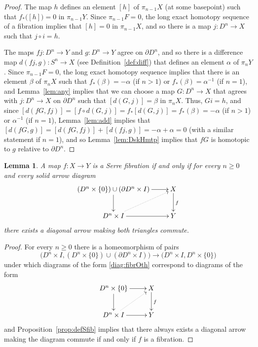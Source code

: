 \documentclass{amsart}
\numberwithin{equation}{section}
\theoremstyle{slplain}
\newtheorem{lem}[equation]{Lemma}
\theoremstyle{definition}
\theoremstyle{remark}
\newcommand{\propref}{Proposition~\ref}
\newcommand{\lemref}{Lemma~\ref}
\newcommand{\defref}{Definition~\ref}
\newcommand{\bdry}{\partial}
\begin{document}
\begin{proof}
  The map $h$ defines an element $[h]$ of $\pi_{n-1}X$ (at some
  basepoint) such that $f_{*}\bigl([h]\bigr) = 0$ in $\pi_{n-1}Y$.
  Since $\pi_{n-1}F = 0$, the long exact homotopy sequence of a
  fibration implies that $[h] = 0$ in $\pi_{n-1}X$, and so there is a
  map $j\colon D^{n} \to X$ such that $j\circ i = h$.

  The maps $fj\colon D^{n} \to Y$ and $g\colon D^{n} \to Y$ agree on
  $\partial D^{n}$, and so there is a difference map $d(fj,g)\colon
  S^{n} \to X$ (see \defref{def:diff}) that defines an element
  $\alpha$ of $\pi_{n}Y$.  Since $\pi_{n-1}F = 0$, the long exact
  homotopy sequence implies that there is an element $\beta$ of
  $\pi_{n}X$ such that $f_{*}(\beta) = -\alpha$ (if $n>1$) or
  $f_{*}(\beta) = \alpha^{-1}$ (if $n=1$), and \lemref{lem:any}
  implies that we can choose a map $G\colon D^{n} \to X$ that agrees
  with $j\colon D^{n} \to X$ on $\partial D^{n}$ such that $[d(G,j)] =
  \beta$ in $\pi_{n}X$.  Thus, $Gi = h$, and since $[d(fG, fj)] =
  [f\circ d(G,j)] = f_{*}[d(G,j)] = f_{*}(\beta) = -\alpha$ (if $n>1$)
  or $\alpha^{-1}$ (if $n=1$), \lemref{lem:add} implies that
  $[d(fG,g)] = [d(fG,fj)] + [d(fj,g)] = -\alpha + \alpha = 0$ (with a
  similar statement if $n=1$), and so \lemref{lem:DskHmtp} implies
  that $fG$ is homotopic to $g$ relative to $\bdry D^{n}$.
\end{proof}


\begin{lem}
  \label{lem:fibr}
  A map $f\colon X \to Y$ is a Serre fibration if and only if for
  every $n \ge 0$ and every solid arrow diagram
  \begin{equation}
    \label{diag:fibrOth}
    \vcenter{
      \xymatrix{
        {(D^{n}\times\{0\}) \cup (\partial D^{n}\times I)}
        \ar[r] \ar[d]
        & {X} \ar[d]^{f}\\
        {D^{n}\times I} \ar[r] \ar@{..>}[ur]
        & {Y}
      }%
    }%
  \end{equation}
  there exists a diagonal arrow making both triangles commute.
\end{lem}

\begin{proof}
  For every $n \ge 0$ there is a homeomorphism of pairs
  \begin{displaymath}
    \bigl(D^{n}\times I, (D^{n}\times\{0\}) \cup
    (\partial D^{n}\times I)\bigr)
    \longrightarrow
    \bigl(D^{n}\times I, D^{n}\times\{0\}\bigr)
  \end{displaymath}
  under which diagrams of the form \eqref{diag:fibrOth} correspond to
  diagrams of the form
  \begin{displaymath}
    \xymatrix{
      {D^{n}\times \{0\}} \ar[r] \ar[d]
      & {X} \ar[d]^{f}\\
      {D^{n}\times I} \ar[r] \ar@{..>}[ur]
      & {Y}
    }
  \end{displaymath}
  and \propref{prop:defSfib} implies that there always exists a
  diagonal arrow making the diagram commute if and only if $f$ is a
  fibration.
\end{proof}
\end{document}
